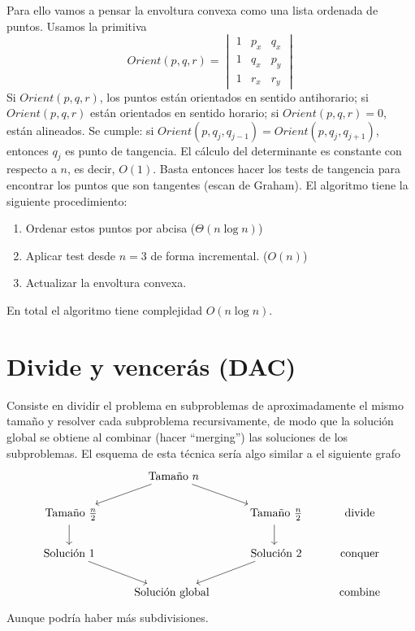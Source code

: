 \documentclass[AL.tex]{subfiles}
\begin{document}
\begin{ejs}
\begin{enumerate}
 Para ello vamos a pensar la envoltura convexa como una lista ordenada de puntos. Usamos la primitiva $$Orient(p,q,r)=\begin{vmatrix}
 1 & p_x & q_x\\
 1 & q_x & p_y\\
 1 & r_x & r_y
 \end{vmatrix}$$
 Si $Orient(p,q,r)$, los puntos están orientados en sentido antihorario; si $Orient(p,q,r)$ están orientados en sentido horario; si $Orient(p,q,r)=0$, están alineados. Se cumple: si $Orient(p,q_j,q_{j-1})=Orient(p,q_j,q_{j+1})$, entonces $q_j$ es punto de tangencia. El cálculo del determinante es constante con respecto a $n$, es decir, $O(1)$. Basta entonces hacer los tests de tangencia para encontrar los puntos que son tangentes (escan de Graham). El algoritmo tiene la siguiente procedimiento:
 \begin{enumerate}
 \item Ordenar estos puntos por abcisa ($\Theta(n\log n)$)
 \item Aplicar test desde $n=3$ de forma incremental. ($O(n)$)
 \item Actualizar la envoltura convexa. 
 \end{enumerate}
 En total el algoritmo tiene complejidad $O(n\log n)$. 
\end{enumerate}
\end{ejs}

\section{Divide y vencerás (DAC)}
Consiste en dividir el problema en subproblemas de aproximadamente el mismo tamaño y resolver cada subproblema recursivamente, de modo que la solución global se obtiene al combinar (hacer ``merging'') las soluciones de los subproblemas. El esquema de esta técnica sería algo similar a el siguiente grafo
\[
\begin{tikzcd}
  & \text{ Tamaño } n\arrow[dl]\arrow[dr] & & \\
\text{ Tamaño }\frac{n}{2}\arrow[d] & & \text{ Tamaño }\frac{n}{2}\arrow[d]& \text{divide}\\
\text{Solución }1 \arrow[dr] & & \text{ Solución }2\arrow[dl] & \text{conquer}\\
                             & \text{Solución global} &     & \text{combine}
\end{tikzcd}
\]
Aunque podría haber más subdivisiones.
\end{document}
